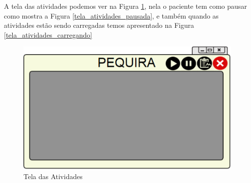 \documentclass[12pt]{article}
\begin{document}
\newpage{}
A tela das atividades podemos ver na Figura \ref{tela_das_atividades}, nela o paciente tem como pausar como mostra a Figura \ref{tela_atividades_pausada}, e também quando as atividades estão sendo carregadas temos apresentado na Figura \ref{tela_atividades_carregando}
\begin{figure}[h]
\centering
\includegraphics[scale=0.5]{imagens2/2-1TeladosJogos_Testes.pdf}
\caption{Tela das Atividades}
\label{tela_das_atividades}
\end{figure}
\end{document}
